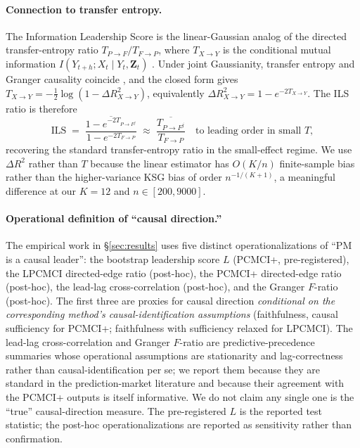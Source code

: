 \documentclass{article}
\begin{document}
\paragraph{Connection to transfer entropy.}
The Information Leadership Score is the linear-Gaussian analog of the directed transfer-entropy ratio $T_{P \to F} / T_{F \to P}$, where $T_{X \to Y}$ is the conditional mutual information $I(Y_{t+h}; X_t \mid Y_t, \mathbf{Z}_t)$ \citep{schreiber2000measuring}. Under joint Gaussianity, transfer entropy and Granger causality coincide \citep{barnett2009granger}, and the closed form gives $T_{X \to Y} = -\tfrac{1}{2}\log(1 - \Delta R^2_{X \to Y})$, equivalently $\Delta R^2_{X \to Y} = 1 - e^{-2 T_{X \to Y}}$. The ILS ratio is therefore
\begin{equation*}
\mathrm{ILS} \;=\; \frac{\overline{1 - e^{-2 T_{P \to F^j}}}}{1 - e^{-2 T_{F \to P}}} \;\approx\; \frac{\overline{T_{P \to F^j}}}{T_{F \to P}} \quad \text{to leading order in small } T,
\end{equation*}
recovering the standard transfer-entropy ratio in the small-effect regime. We use $\Delta R^2$ rather than $T$ because the linear estimator has $O(K/n)$ finite-sample bias rather than the higher-variance KSG bias of order $n^{-1/(K+1)}$, a meaningful difference at our $K = 12$ and $n \in [200, 9000]$.

\paragraph{Operational definition of ``causal direction.''}
The empirical work in \S\ref{sec:results} uses five distinct operationalizations of ``PM is a causal leader'': the bootstrap leadership score $L$ (PCMCI+, pre-registered), the LPCMCI directed-edge ratio (post-hoc), the PCMCI+ directed-edge ratio (post-hoc), the lead-lag cross-correlation (post-hoc), and the Granger $F$-ratio (post-hoc). The first three are proxies for causal direction \emph{conditional on the corresponding method's causal-identification assumptions} (faithfulness, causal sufficiency for PCMCI+; faithfulness with sufficiency relaxed for LPCMCI). The lead-lag cross-correlation and Granger $F$-ratio are predictive-precedence summaries whose operational assumptions are stationarity and lag-correctness rather than causal-identification per se; we report them because they are standard in the prediction-market literature and because their agreement with the PCMCI+ outputs is itself informative. We do not claim any single one is the ``true'' causal-direction measure. The pre-registered $L$ is the reported test statistic; the post-hoc operationalizations are reported as sensitivity rather than confirmation.
\end{document}
